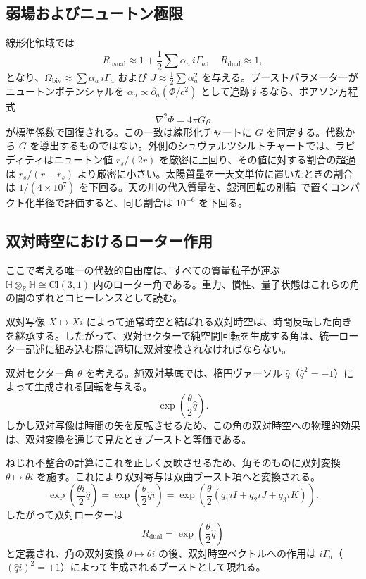 \documentclass[a4paper]{article}
\begin{document}
\subsection{弱場およびニュートン極限}

線形化領域では
\[
R_\text{usual} \approx 1 + \frac{1}{2} \sum \alpha_a \, i\Gamma_a, \quad R_\text{dual} \approx 1,
\]
となり、$\Omega_\text{biv} \approx \sum \alpha_a \, i\Gamma_a$ および $J \approx \frac{1}{2} \sum \alpha_a^2$ を与える。ブーストパラメーターがニュートンポテンシャルを $\alpha_a \propto \partial_a (\Phi/c^2)$ として追跡するなら、ポアソン方程式
\[
\nabla^2 \Phi = 4\pi G \rho
\]
が標準係数で回復される。この一致は線形化チャートに $G$ を同定する。代数から $G$ を導出するものではない。外側のシュヴァルツシルトチャートでは、ラピディティはニュートン値 $r_s/(2r)$ を厳密に上回り、その値に対する割合の超過は $r_s/(r-r_s)$ より厳密に小さい。太陽質量を一天文単位に置いたときの割合は $1/(4\times 10^7)$ を下回る。天の川の代入質量を、銀河回転の別稿~\cite{dst-galactic}で置くコンパクト化半径で評価すると、同じ割合は $10^{-6}$ を下回る。

\subsection{双対時空におけるローター作用}
\label{subsec:dual-rotors}

ここで考える唯一の代数的自由度は、すべての質量粒子が運ぶ $\mathbb{H} \otimes_{\mathbb{R}} \mathbb{H} \cong \mathrm{Cl}(3,1)$ 内のローター角である。重力、慣性、量子状態はこれらの角の間のずれとコヒーレンスとして読む。

双対写像 $X \mapsto Xi$ によって通常時空と結ばれる双対時空は、時間反転した向きを継承する。したがって、双対セクターで純空間回転を生成する角は、統一ローター記述に組み込む際に適切に双対変換されなければならない。

双対セクター角 $\theta$ を考える。純双対基底では、楕円ヴァーソル $\hat{q}$（$\hat{q}^2 = -1$）によって生成される回転を与える。
\[
\exp\left( \frac{\theta}{2} \hat{q} \right).
\]
しかし双対写像は時間の矢を反転させるため、この角の双対時空への物理的効果は、双対変換を通じて見たときブーストと等価である。

ねじれ不整合の計算にこれを正しく反映させるため、角そのものに双対変換 $\theta \mapsto \theta i$ を施す。これにより双対寄与は双曲ブースト項へと変換される。
\[
\exp\left( \frac{\theta i}{2} \hat{q} \right) = \exp\left( \frac{\theta}{2} \hat{q}i \right) = \exp\left( \frac{\theta}{2} (q_1 iI + q_2 iJ + q_3 iK) \right).
\]
したがって双対ローターは
\[
R_\text{dual} = \exp\left( \frac{\theta}{2} \hat{q} \right)
\]
と定義され、角の双対変換 $\theta \mapsto \theta i$ の後、双対時空ベクトルへの作用は $i\Gamma_a$（$(\hat{q}i)^2 = +1$）によって生成されるブーストとして現れる。
\end{document}

